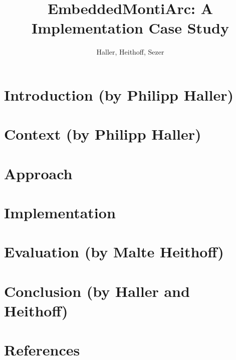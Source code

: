 \documentclass{elsarticle}
\begin{document}
\begin{frontmatter}

\title{EmbeddedMontiArc: A Implementation Case Study}
\tnotetext[mytitlenote]{}

\author{Haller, Heithoff, Sezer}
\address{RWTH Aachen}



\begin{abstract}

\end{abstract}

\begin{keyword}

\end{keyword}

\end{frontmatter}

\linenumbers


\newpage
\section{Introduction (by Philipp Haller)}
\label{sec:intro}


\newpage
\section{Context (by Philipp Haller)}
\label{sec:context}


\newpage
\section{Approach}
\label{sec:approach}


\newpage
\section{Implementation}
\label{sec:implementation}


\newpage
\section{Evaluation (by Malte Heithoff)}
\label{sec:evaluation}


\newpage
\section{Conclusion (by Haller and Heithoff)}
\label{sec:conclusion}



\newpage
\section*{References}

\end{document}
